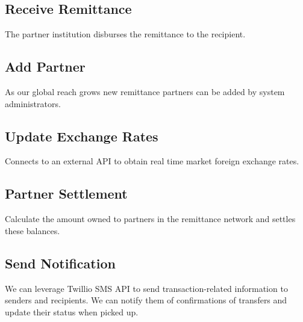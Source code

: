 \documentclass[onecolumn, letterpaper, ]{report}
\begin{document}
        \subsection{Receive Remittance} The partner institution disburses the remittance to the recipient. 

        \subsection{Add Partner} As our global reach grows new remittance partners can be added by system administrators.

        \subsection{Update Exchange Rates} Connects to an external API to obtain real time market foreign exchange rates. 

        \subsection{Partner Settlement} Calculate the amount owned to partners in the remittance network and settles these balances.

        \subsection{Send Notification} We can leverage Twillio SMS API to send transaction-related information to senders and recipients. We can notify them of confirmations of transfers and update their status when picked up.
    
\end{document}
